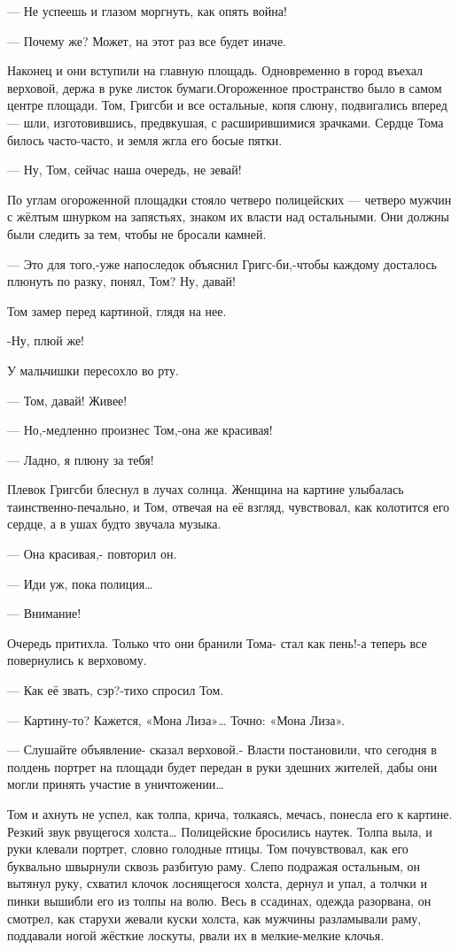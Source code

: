— Не успеешь и глазом моргнуть, как опять война!

— Почему же? Может, на этот раз все будет иначе.

Наконец и они вступили на главную площадь. Одновременно в город въехал
верховой, держа в руке листок бумаги.Огороженное пространство было в самом
центре площади. Том, Григсби и все остальные, копя слюну, подвигались вперед —
шли, изготовившись, предвкушая, с расширившимися зрачками. Сердце Тома билось
часто-часто, и земля жгла его босые пятки.

— Ну, Том, сейчас наша очередь, не зевай!

По углам огороженной площадки стояло четверо полицейских — четверо мужчин с
жёлтым шнурком на запястьях, знаком их власти над остальными. Они должны были
следить за тем, чтобы не бросали камней.

— Это для того,-уже напоследок объяснил Григс-би,-чтобы каждому досталось
плюнуть по разку, понял, Том? Ну, давай!

Том замер перед картиной, глядя на нее.

-Ну, плюй же!

У мальчишки пересохло во рту.

— Том, давай! Живее!

— Но,-медленно произнес Том,-она же красивая!

— Ладно, я плюну за тебя!

Плевок Григсби блеснул в лучах солнца. Женщина на картине улыбалась
таинственно-печально, и Том, отвечая на её взгляд, чувствовал, как колотится
его сердце, а в ушах будто звучала музыка.

— Она красивая,- повторил он.

— Иди уж, пока полиция…

— Внимание!

Очередь притихла. Только что они бранили Тома- стал как пень!-а теперь все
повернулись к верховому.

— Как её звать, сэр?-тихо спросил Том.

— Картину-то? Кажется, «Мона Лиза»… Точно: «Мона Лиза».

— Слушайте объявление- сказал верховой.- Власти постановили, что сегодня в
полдень портрет на площади будет передан в руки здешних жителей, дабы они могли
принять участие в уничтожении…

Том и ахнуть не успел, как толпа, крича, толкаясь, мечась, понесла его к
картине. Резкий звук рвущегося холста… Полицейские бросились наутек. Толпа
выла, и руки клевали портрет, словно голодные птицы. Том почувствовал, как его
буквально швырнули сквозь разбитую раму. Слепо подражая остальным, он вытянул
руку, схватил клочок лоснящегося холста, дернул и упал, а толчки и пинки
вышибли его из толпы на волю. Весь в ссадинах, одежда разорвана, он смотрел,
как старухи жевали куски холста, как мужчины разламывали раму, поддавали ногой
жёсткие лоскуты, рвали их в мелкие-мелкие клочья.

